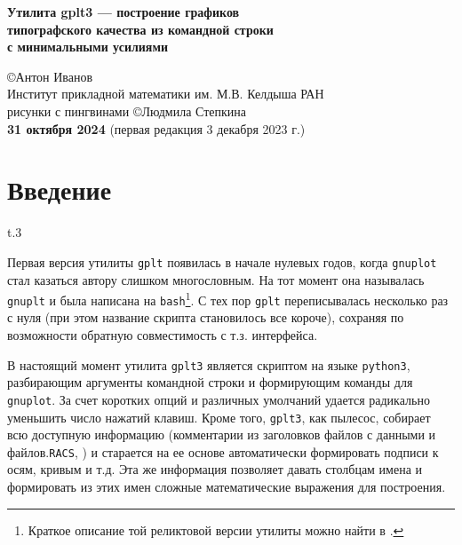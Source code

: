 \documentclass[12pt]{article}
\def\gplt{{\tt gplt}}
\def\gnuplot{{\tt gnuplot}}
\def\python{{\tt python3}}
\def\RACS{{\tt RACS}}
\begin{document}
\begin{center}
 { \Large\bf
Утилита gplt3 --- построение графиков\\ типографского качества из командной строки\\ с минимальными усилиями\\[5mm]
}

\large
\copyright Антон Иванов\\[2mm] 
\normalsize
Институт прикладной математики им. М.В. Келдыша РАН\\[2mm]

\small рисунки с пингвинами \copyright Людмила Степкина\\[3mm]
{\bf 31 октября 2024} (первая редакция 3 декабря 2023 г.)\\[7mm]

\end{center}

\vspace{-2cm}

\tableofcontents

\newpage
\section{Введение}
\begin{wrapfigure}[5]{t}{.3\textwidth}
  \vphantom{.}
  \vspace{-1.5cm}

\end{wrapfigure}
Первая версия утилиты \gplt{} появилась в начале нулевых годов, когда \gnuplot{} стал казаться автору слишком многословным.
На тот момент она называлась \verb'gnuplt' и была написана на \verb'bash'\footnote{Краткое описание той реликтовой версии утилиты можно найти в \cite{aiv:racs2007}.}.
С тех пор \gplt{} переписывалась несколько раз с нуля (при этом название скрипта становилось все короче),
сохраняя по возможности обратную совместимость с т.з. интерфейса.  

\def\gplt{{\tt gplt3}}

В настоящий момент утилита \gplt{} является скриптом на языке \python, разбирающим аргументы командной строки и формирующим команды для \gnuplot.
За счет коротких опций и различных умолчаний удается радикально уменьшить число нажатий клавиш. Кроме того, \gplt{}, как пылесос, собирает всю доступную информацию
(комментарии из заголовков файлов с данными и файлов.\RACS, \cite{aiwlib:SR:PP2018})
и старается на ее основе автоматически формировать подписи к осям, кривым и т.д.
Эта же информация позволяет давать столбцам имена и формировать из этих имен сложные математические выражения для построения.
\end{document}

